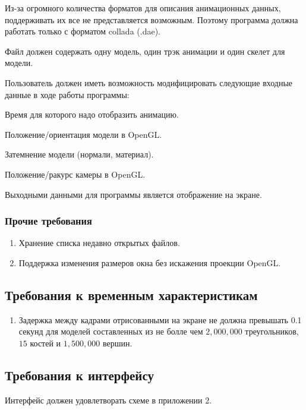 \begin{my_enumerate}
\item Из-за огромного количества форматов для описания анимационных данных, поддерживать их все не представляется возможным. Поэтому программа должна работать только с форматом collada (.dae).
\item Файл должен содержать одну модель, один трэк анимации и один скелет для модели.
\item Пользователь должен иметь возможность модифицировать следующие входные данные в ходе работы программы:
\begin{my_enumerate}
\item Время для которого надо отобразить анимацию.
\item Положение/ориентация модели в OpenGL.
\item Затемнение модели (нормали, материал).
\item Положение/ракурс камеры в OpenGL.
\end{my_enumerate}
\end{my_enumerate}

\medskip
Выходными данными для программы является отображение на экране.


\subsubsection{Прочие требования}
\begin{enumerate}
\item Хранение списка недавно открытых файлов.
\item Поддержка изменения размеров окна без искажения проекции OpenGL.
\end{enumerate}

\subsection{Требования к временным характеристикам}
\begin{enumerate}
\item Задержка между кадрами отрисованными на экране не должна превышать 0.1 секунд для моделей составленных из не болле чем $2,000,000$ треугольников, $15$ костей и $1,500,000$ вершин.
\end{enumerate}


\subsection{Требования к интерфейсу}
Интерфейс должен удовлетворать схеме в приложении 2.

